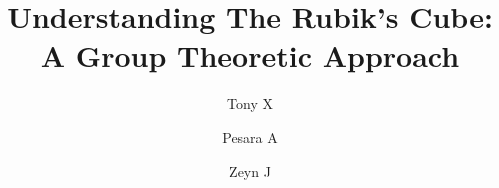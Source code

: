 \documentclass[final]{beamer}
\title{Understanding The Rubik's Cube: A Group Theoretic Approach}
\author{Tony X \and Pesara A  \and Zeyn J}
\newlength{\sepwidth}
\newlength{\colwidth}
\newcommand{\separatorcolumn}{\begin{column}{\sepwidth}\end{column}}
\begin{document}
\pgfmathsetmacro{}
\newcommand{\frontcolor}{red}
\newcommand{\sidecolor}{blue}
\begin{frame}[t]
\begin{columns}[t]
\separatorcolumn

\begin{column}{\colwidth}






\end{column}
\end{columns}
\end{frame}
\end{document}
